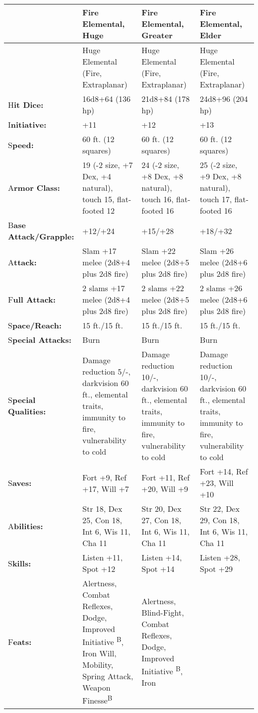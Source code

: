 \documentclass{article}
\begin{document}
\vspace{12pt}
\begin{tabular}{|>{\raggedright}p{48pt}|>{\raggedright}p{72pt}|>{\raggedright}p{87pt}|>{\raggedright}p{93pt}|}
\hline
  & F\textbf{ire Elemental, Huge} & F\textbf{ire Elemental, Greater} & F\textbf{ire 
Elemental, Elder}\tabularnewline
\hline
  & Huge Elemental {\small{}(Fire, Extraplanar)} & Huge Elemental {\small{}(Fire, 
Extraplanar)} & Huge Elemental {\small{}(Fire, Extraplanar)}\tabularnewline
\hline
H\textbf{it Dice:} & 16d8+64 (136 hp) & 21d8+84 (178 hp) & 24d8+96 (204 hp)\tabularnewline
\hline
I\textbf{nitiative:} & +11 & +12 & +13\tabularnewline
\hline
S\textbf{peed:} & 60 ft. (12 squares) & 60 ft. (12 squares) & 60 ft. (12 squares)\tabularnewline
\hline
A\textbf{rmor Class:} & 19 (-2 size, +7 Dex, +4 natural), touch 15, flat-footed 
12 & 24 (-2 size, +8 Dex, +8 natural), touch 16, flat-footed 16 & 25 (-2 size, 
+9 Dex, +8 natural), touch 17, flat-footed 16\tabularnewline
\hline
B\textbf{ase Attack/Grapple:} & +12/+24 & +15/+28 & +18/+32\tabularnewline
\hline
A\textbf{ttack:} & Slam +17 melee (2d8+4 plus 2d8 fire) & Slam +22 melee (2d8+5 
plus 2d8 fire) & Slam +26 melee (2d8+6 plus 2d8 fire)\tabularnewline
\hline
F\textbf{ull Attack:} & 2 slams +17 melee (2d8+4 plus 2d8 fire) & 2 slams +22 melee 
(2d8+5 plus 2d8 fire) & 2 slams +26 melee (2d8+6 plus 2d8 fire)\tabularnewline
\hline
S\textbf{pace/Reach:} & 15 ft./15 ft. & 15 ft./15 ft. & 15 ft./15 ft.\tabularnewline
\hline
S\textbf{pecial Attacks:} & Burn & Burn & Burn\tabularnewline
\hline
S\textbf{pecial Qualities:} & Damage reduction 5/-, darkvision 60 ft., elemental 
traits, immunity to fire, vulnerability to cold & Damage reduction 10/-, darkvision 
60 ft., elemental traits, immunity to fire, vulnerability to cold & Damage reduction 
10/-, darkvision 60 ft., elemental traits, immunity to fire, vulnerability to cold\tabularnewline
\hline
S\textbf{aves:} & Fort +9, Ref +17, Will +7 & Fort +11, Ref +20, Will +9 & Fort 
+14, Ref +23, Will +10\tabularnewline
\hline
A\textbf{bilities:} & Str 18, Dex 25, Con 18, Int 6, Wis 11, Cha 11 & Str 20, Dex 
27, Con 18, Int 6, Wis 11, Cha 11 & Str 22, Dex 29, Con 18, Int 6, Wis 11, Cha 
11\tabularnewline
\hline
S\textbf{kills:} & Listen +11, Spot +12 & Listen +14, Spot +14 & Listen +28, Spot 
+29\tabularnewline
\hline
F\textbf{eats:} & Alertness, Combat Reflexes, Dodge, Improved Initiative \textsuperscript{B}, 
Iron Will, Mobility, Spring Attack, Weapon Finesse\textsuperscript{B} & Alertness, 
Blind-Fight, Combat Reflexes, Dodge, Improved Initiative \textsuperscript{B}, Iron 

\end{tabular}
\end{document}
